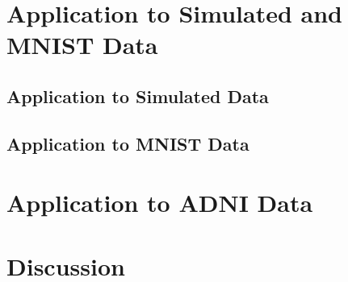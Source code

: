 \documentclass[11pt,reqno]{article}
\theoremstyle{definition}
\begin{document}
\section{Application to Simulated and MNIST Data}

\subsection{Application to Simulated Data}

\subsection{Application to MNIST Data}

\section{Application to ADNI Data}

\section{Discussion}

\newpage

\nocite{*}
%
%
\printbibliography
\end{document}
